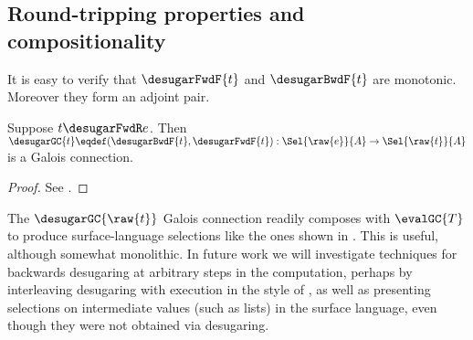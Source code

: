 \subsection{Round-tripping properties and compositionality}

It is easy to verify that $\desugarFwdF{t}$ and $\desugarBwdF{t}$ are monotonic. Moreover they form an adjoint pair.

\begin{theorem}
  \label{thm:surface-language:desugar:gc}
     Suppose $t \desugarFwdR e$. Then ${\desugarGC{t}} \eqdef (\desugarBwdF{t}, \desugarFwdF{t}): \Sel{\raw{e}}{A} \to \Sel{\raw{t}}{A}$ is a Galois connection.
\end{theorem}

\begin{proof}
   \ifappendices See . \else \ProofInSupplementaryMaterial \fi
\end{proof}

\noindent The $\desugarGC{\raw{t}}$ Galois connection readily composes with $\evalGC{T}$ to produce surface-language selections like the ones shown in . This is useful, although somewhat monolithic. In future work we will investigate techniques for backwards desugaring at arbitrary steps in the computation, perhaps by interleaving desugaring with execution in the style of \citet{pombrio14}, as well as presenting selections on intermediate values (such as lists) in the surface language, even though they were not obtained via desugaring.
